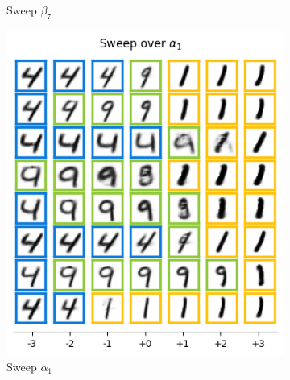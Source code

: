 \begin{figure}[h]
\begin{subfigure}[t]{.23\linewidth}
        \caption{Sweep $\beta_7$}
    \end{subfigure}
    \caption{Visualizations of learned latent factors for MNIST classifier trained on classes '3' \& '8'}
    \label{fig:complte_:mnist_results 38}

    \begin{subfigure}[t]{.23\linewidth}
        \includegraphics[width=.9\textwidth]{../openreview/pictures/Figure13/alpha_1.png}
        \caption{Sweep $\alpha_1$}
    \end{subfigure}
     \begin{subfigure}[t]{.23\linewidth}

\end{subfigure}
\end{figure}
